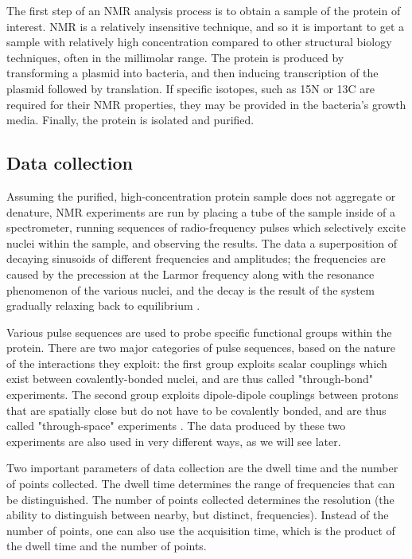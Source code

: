 The first step of an NMR analysis process is to obtain a sample of the protein
of interest.  NMR is a relatively insensitive technique, and so it is important
to get a sample with relatively high concentration compared to other structural
biology techniques, often in the millimolar range.  The protein is produced
by transforming a plasmid into bacteria, and then inducing transcription 
of the plasmid followed by translation.  If specific isotopes, such as 15N or 
13C are required for their NMR properties, they may be provided in the 
bacteria's growth media.  Finally, the protein is isolated and purified.

\subsection*{Data collection}

Assuming the purified, high-concentration protein sample does not aggregate
or denature, NMR experiments are run by placing a tube of the sample inside 
of a spectrometer, running sequences of radio-frequency pulses which selectively
excite nuclei within the sample, and observing the results.  The data a 
superposition of decaying sinusoids of different frequencies and amplitudes;
the frequencies are caused by the precession at the Larmor frequency along with
the resonance phenomenon of the various nuclei, and the decay is the result
of the system gradually relaxing back to equilibrium \cite{bloch1946nuclear}.

Various pulse sequences are used to probe specific functional groups within
the protein.  There are two major categories of pulse sequences, based on the
nature of the interactions they exploit: the first group exploits scalar 
couplings which exist between covalently-bonded nuclei, and are thus called 
"through-bond" experiments.  The second group exploits dipole-dipole couplings
between protons that are spatially close but do not have to be covalently
bonded, and are thus called "through-space" experiments
\cite{solomon1955relaxation}.  The data produced by
these two experiments are also used in very different ways, as we will see
later.

Two important parameters of data collection are the dwell time and the number
of points collected.  The dwell time determines the range of frequencies that
can be distinguished.  The number of points collected determines the resolution
(the ability to distinguish between nearby, but distinct, frequencies).  Instead
of the number of points, one can also use the acquisition time, which is the
product of the dwell time and the number of points.

